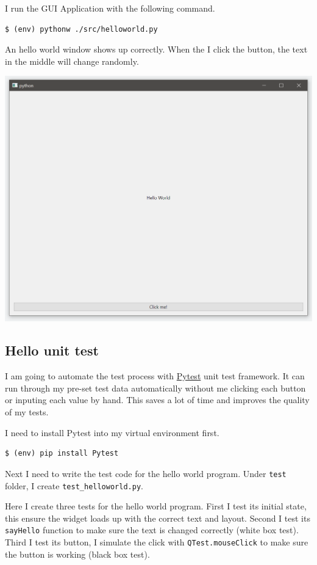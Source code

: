 \documentclass[a4paper]{report}
\begin{document}
I run the GUI Application with the following command.

\begin{verbatim}
$ (env) pythonw ./src/helloworld.py
\end{verbatim}

An hello world window shows up correctly. When the I click the  button, the text in the middle will change randomly.

\includegraphics[width=\linewidth]{Hello-World.png}

\subsection{Hello unit test}

I am going to automate the test process with \href{https://docs.pytest.org/}{Pytest} unit test framework. It can run through my pre-set test data automatically without me clicking each button or inputing each value by hand. This saves a lot of time and improves the quality of my tests.

I need to install Pytest into my virtual environment first.

\begin{verbatim}
$ (env) pip install Pytest
\end{verbatim}

Next I need to write the test code for the hello world program. Under \texttt{test} folder, I create \texttt{test_helloworld.py}.

Here I create three tests for the hello world program. First I test its initial state, this ensure the widget loads up with the correct text and layout. Second I test its \texttt{sayHello} function to make sure the text is changed correctly (white box test). Third I test its button, I simulate the click with \texttt{QTest.mouseClick} to make sure the button is working (black box test).
\end{document}
